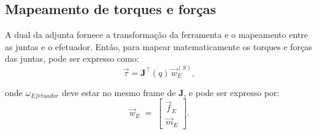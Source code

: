 






\subsection{Mapeamento de torques e forças}
A dual da adjunta fornece a transformação da ferramenta e o mapeamento entre as juntas e o efetuador.
Então, para mapear matematicamente os torques e forças das juntas, pode ser expresso como:
\begin{equation}
\label{eq:tau_torque1}
\vec\tau=\mathbf J^\top(q)\,\vec w_E^{(S)},
\end{equation}

onde $\omega_{Efetuador}$ deve estar no mesmo frame de $\mathbf{J}$, e pode ser expresso por:
\begin{equation}
\label{eq:tau_torque2}
\vec{w}_{E} \;=\;
\begin{bmatrix}
\vec{f}_{E}\\ \vec{m}_{E}
\end{bmatrix}.
\end{equation}

